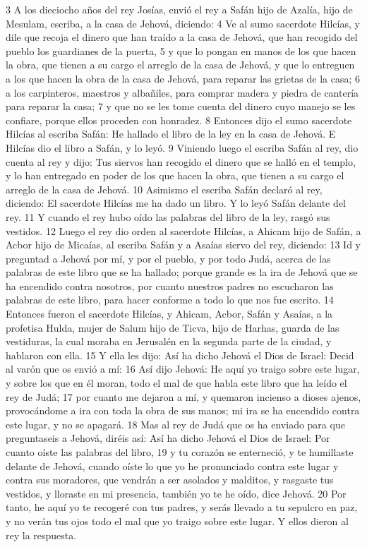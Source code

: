  
3 A los dieciocho años del rey Josías, envió el rey a Safán hijo de Azalía, hijo de Mesulam, escriba, a la casa de Jehová, diciendo:
4 Ve al sumo sacerdote Hilcías, y dile que recoja el dinero que han traído a la casa de Jehová, que han recogido del pueblo los guardianes de la puerta,
5 y que lo pongan en manos de los que hacen la obra, que tienen a su cargo el arreglo de la casa de Jehová, y que lo entreguen a los que hacen la obra de la casa de Jehová, para reparar las grietas de la casa;
6 a los carpinteros, maestros y albañiles, para comprar madera y piedra de cantería para reparar la casa;
7 y que no se les tome cuenta del dinero cuyo manejo se les confiare, porque ellos proceden con honradez.
8 Entonces dijo el sumo sacerdote Hilcías al escriba Safán: He hallado el libro de la ley en la casa de Jehová. E Hilcías dio el libro a Safán, y lo leyó.
9 Viniendo luego el escriba Safán al rey, dio cuenta al rey y dijo: Tus siervos han recogido el dinero que se halló en el templo, y lo han entregado en poder de los que hacen la obra, que tienen a su cargo el arreglo de la casa de Jehová.
10 Asimismo el escriba Safán declaró al rey, diciendo: El sacerdote Hilcías me ha dado un libro. Y lo leyó Safán delante del rey.
11 Y cuando el rey hubo oído las palabras del libro de la ley, rasgó sus vestidos.
12 Luego el rey dio orden al sacerdote Hilcías, a Ahicam hijo de Safán, a Acbor hijo de Micaías, al escriba Safán y a Asaías siervo del rey, diciendo:
13 Id y preguntad a Jehová por mí, y por el pueblo, y por todo Judá, acerca de las palabras de este libro que se ha hallado; porque grande es la ira de Jehová que se ha encendido contra nosotros, por cuanto nuestros padres no escucharon las palabras de este libro, para hacer conforme a todo lo que nos fue escrito.
14 Entonces fueron el sacerdote Hilcías, y Ahicam, Acbor, Safán y Asaías, a la profetisa Hulda, mujer de Salum hijo de Ticva, hijo de Harhas, guarda de las vestiduras, la cual moraba en Jerusalén en la segunda parte de la ciudad, y hablaron con ella.
15 Y ella les dijo: Así ha dicho Jehová el Dios de Israel: Decid al varón que os envió a mí:
16 Así dijo Jehová: He aquí yo traigo sobre este lugar, y sobre los que en él moran, todo el mal de que habla este libro que ha leído el rey de Judá;
17 por cuanto me dejaron a mí, y quemaron incienso a dioses ajenos, provocándome a ira con toda la obra de sus manos; mi ira se ha encendido contra este lugar, y no se apagará.
18 Mas al rey de Judá que os ha enviado para que preguntaseis a Jehová, diréis así: Así ha dicho Jehová el Dios de Israel: Por cuanto oíste las palabras del libro,
19 y tu corazón se enterneció, y te humillaste delante de Jehová, cuando oíste lo que yo he pronunciado contra este lugar y contra sus moradores, que vendrán a ser asolados y malditos, y rasgaste tus vestidos, y lloraste en mi presencia, también yo te he oído, dice Jehová.
20 Por tanto, he aquí yo te recogeré con tus padres, y serás llevado a tu sepulcro en paz, y no verán tus ojos todo el mal que yo traigo sobre este lugar. Y ellos dieron al rey la respuesta.

